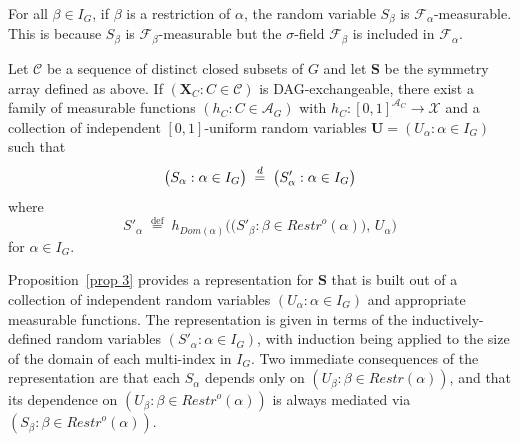 \documentclass[10pt]{amsart}
\theoremstyle{definition}\newtheorem{defi}[theo]{Definition}\newtheorem{rema}[theo]{Remark}\newtheorem{exam}[theo]{Example}\newtheorem{exem}[theo]{Example}\newtheorem{nota}[theo]{Notation}
\newcommand{\alf}{\alpha}%
\newcommand*\bb{\beta}
\newcommand*{\defeq}{\stackrel{\mathrm{def}}{=}}
\renewcommand{\d}{\buildrel{d}\over{=}}
\newcommand*\rstr{\mathit{Restr}}
\newcommand*\srstr{\mathit{Restr}^o}
\newcommand*\dom{\mathit{Dom}}
\renewcommand{\AA}{\mathcal{A}}
\newcommand*\CC{{\mathcal{C}}}
\newcommand*\XX{{\mathcal{X}}}
\newcommand*\bS{\mathbf{S}}
\newcommand*\bU{\mathbf{U}}
\newcommand*\bX{\mathbf{X}}
\begin{document}
For all $\bb \in I_G$, if $\bb$ is a restriction of $\alf$, the random variable $S_{\bb}$ is $\mathcal{F}_\alf$-measurable. This is because $S_{\bb}$ is $\mathcal{F}_\bb$-measurable but the $\sigma$-field $\mathcal{F}_\bb$ is included in $\mathcal{F}_\alf$.

\begin{prop}\label{prop 3}
Let $\CC$ be a sequence of distinct closed subsets of $G$ and let $\bS$ be the {symmetry} array defined as above. If $(\bX_C : C \in \CC)$ is DAG-exchangeable, there exist a family of measurable functions $(h_C : C \in \AA_G)$ with $h_C : [0,1]^{\AA_C} \to \XX$ and a collection of independent $[0,1]$-uniform random variables $\bU = (U_\alf : \alf \in I_G)$ such that
\begin{equation}\label{equation: S and S'}
\big(S_\alf : \alf \in I_G\big) \;\d\; \big(S'_\alf : \alf \in I_G\big)
\end{equation}
where
\begin{equation}\label{equation: generalized representation of DAG}
S'_\alf \;
\defeq\; h_{\dom(\alf)}\Big(\big(S'_{\bb} : \bb \in \srstr(\alf)\big),\, U_\alf \Big)
\end{equation}
for $\alf \in I_G$.
\end{prop}

Proposition~\ref{prop 3} provides a representation for $\bS$ that is built out of a collection of independent random variables $(U_\alf : \alf \in I_G)$ and appropriate measurable functions. The representation is given in terms of the inductively-defined random variables $(S'_\alf: \alf\in I_G)$, with induction being applied to the size of the domain of each multi-index in $I_G$. Two immediate consequences of the representation are that each $S_\alf$ depends only on $(U_\bb : \bb \in \rstr(\alf))$, and that its dependence on $(U_\bb : \bb \in \srstr(\alf))$ is always mediated via $(S_\beta : \beta \in \srstr(\alf))$.
\end{document}
